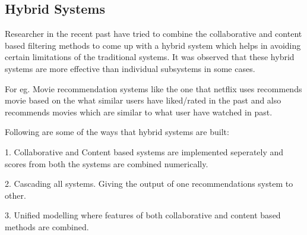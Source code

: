 \subsection{Hybrid Systems}
Researcher in the recent past have tried to combine the collaborative and content based filtering methods to come up with a hybrid system which helps in avoiding certain limitations of the traditional systems. It was observed that these hybrid systems are more effective than individual subsystems in some cases.

For eg. Movie recommendation systems like the one that netflix uses recommends movie based on the what similar users have liked/rated in the past and also recommends movies which are similar to what user have watched in past.

Following are some of the ways that hybrid systems are built:

1. Collaborative and Content based systems are implemented seperately and scores from both the systems are combined numerically.

2. Cascading all systems. Giving the output of one recommendations system to other.

3. Unified modelling where features of both collaborative and content based methods are combined. 